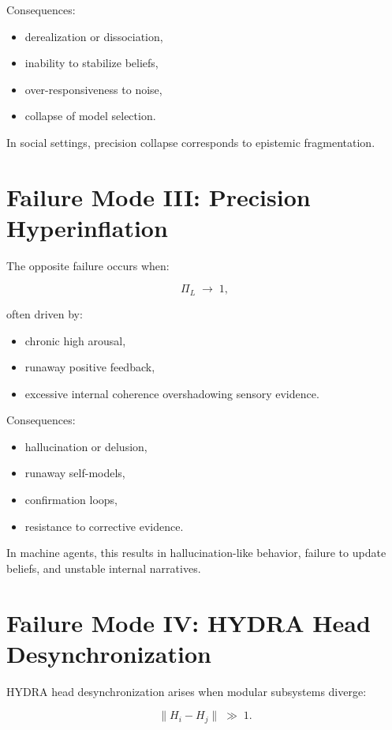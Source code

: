\documentclass[12pt,oneside]{book}
\theoremstyle{plain}
\theoremstyle{definition}
\begin{document}
Consequences:

\begin{itemize}
    \item derealization or dissociation,
    \item inability to stabilize beliefs,
    \item over-responsiveness to noise,
    \item collapse of model selection.
\end{itemize}

In social settings, precision collapse corresponds to epistemic fragmentation.

\section{Failure Mode III: Precision Hyperinflation}

The opposite failure occurs when:

\[
\Pi_L \;\rightarrow\; 1,
\]

often driven by:

\begin{itemize}
    \item chronic high arousal,
    \item runaway positive feedback,
    \item excessive internal coherence overshadowing sensory evidence.
\end{itemize}

Consequences:

\begin{itemize}
    \item hallucination or delusion,
    \item runaway self-models,
    \item confirmation loops,
    \item resistance to corrective evidence.
\end{itemize}

In machine agents, this results in hallucination-like behavior, failure to
update beliefs, and unstable internal narratives.

\section{Failure Mode IV: HYDRA Head Desynchronization}

HYDRA head desynchronization arises when modular subsystems diverge:

\[
\lVert H_i - H_j \rVert \;\gg\; 1.
\]
\end{document}

